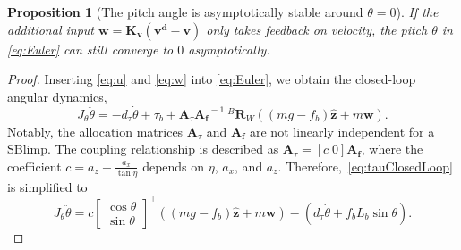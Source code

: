 \documentclass[conference]{ieeeconf}
\newtheorem{proposition}{Proposition}
\begin{document}
\begin{proposition}[The pitch angle is asymptotically stable around $\theta=0$]
    If the additional input $\boldsymbol{w} = 
    \boldsymbol{K_{v}}\left(\boldsymbol{v^d - v}\right)$ only takes feedback on velocity, the pitch $\theta$ in \eqref{eq:Euler} can still converge to $0$ asymptotically.
\end{proposition}
\begin{proof}
Inserting \eqref{eq:u} and \eqref{eq:w} into \eqref{eq:Euler}, we obtain the closed-loop angular dynamics, 
\begin{equation}
    J_\theta\ddot{\theta} = -d_\tau\dot{\theta} + \tau_b + \boldsymbol{A}_\tau\boldsymbol{A_f}^{\!\!\!-1}\:{}^B\!\boldsymbol{R}_{\!W}\left(\left(mg-f_{b}\right)\boldsymbol{\hat z} + m\boldsymbol{w}\right).
    \label{eq:tauClosedLoop}
\end{equation}
Notably, the allocation matrices $\boldsymbol{A}_\tau$ and $\boldsymbol{A_f}$ are not linearly independent for a SBlimp. The coupling relationship is described as $\boldsymbol{A}_\tau = \left[c\; 0\right]\boldsymbol{A_f}$, where the coefficient $c = a_z-\frac{a_x}{\tan{\eta}}$ depends on $\eta$, $a_x$, and $a_z$. Therefore,~\eqref{eq:tauClosedLoop} is simplified to
\begin{equation}
    J_\theta\ddot{\theta} = c\begin{bmatrix}
        \cos{\theta}\\
        \sin{\theta}
    \end{bmatrix}^\top\left(\left(mg-f_{b}\right)\boldsymbol{\hat z} + m\boldsymbol{w}\right) - (d_\tau\dot{\theta}+f_bL_b\sin{\theta}).
    \label{eq:2DangDynamics}
\end{equation}


\end{proof}
\end{document}
